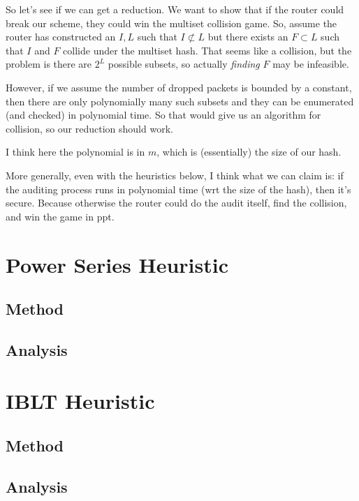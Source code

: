 \documentclass{article}
\begin{document}
So let's see if we can get a reduction. We want to show that if the router
could break our scheme, they could win the multiset collision game. So, assume
the router has constructed an $I, L$ such that $I \not\subset L$ but there
exists an $F \subset L$ such that $I$ and $F$ collide under the multiset hash.
That seems like a collision, but the problem is there are $2^L$ possible
subsets, so actually \emph{finding} $F$ may be infeasible.

However, if we assume the number of dropped packets is bounded by a constant,
then there are only polynomially many such subsets and they can be enumerated
(and checked) in polynomial time. So that would give us an algorithm for
collision, so our reduction should work.

I think here the polynomial is in $m$, which is (essentially) the size of our
hash.

More generally, even with the heuristics below, I think what we can claim is:
if the auditing process runs in polynomial time (wrt the size of the hash),
then it's secure. Because otherwise the router could do the audit itself, find
the collision, and win the game in ppt.

\section{Power Series Heuristic}
\subsection{Method}

\subsection{Analysis}

\section{IBLT Heuristic}
\subsection{Method}

\subsection{Analysis}

\printbibliography
\end{document}
